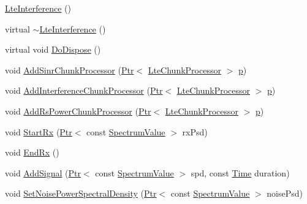 \begin{DoxyCompactItemize}
\item 
\hyperlink{classns3_1_1LteInterference_af0e69d3ae048802b5936815590be1a7c}{Lte\+Interference} ()
\item 
virtual \hyperlink{classns3_1_1LteInterference_a2ae87ae62fed89823398b056e28b862c}{$\sim$\+Lte\+Interference} ()
\item 
virtual void \hyperlink{classns3_1_1LteInterference_ab4fca869d5b5257da9e6b3539e302861}{Do\+Dispose} ()
\item 
void \hyperlink{classns3_1_1LteInterference_a129dde19892e0f1bf051cffef703b680}{Add\+Sinr\+Chunk\+Processor} (\hyperlink{classns3_1_1Ptr}{Ptr}$<$ \hyperlink{classns3_1_1LteChunkProcessor}{Lte\+Chunk\+Processor} $>$ \hyperlink{lte__link__budget__x2__handover__measures_8m_ac9de518908a968428863f829398a4e62}{p})
\item 
void \hyperlink{classns3_1_1LteInterference_a5ef052764d2767c0e2e6524ff889d29d}{Add\+Interference\+Chunk\+Processor} (\hyperlink{classns3_1_1Ptr}{Ptr}$<$ \hyperlink{classns3_1_1LteChunkProcessor}{Lte\+Chunk\+Processor} $>$ \hyperlink{lte__link__budget__x2__handover__measures_8m_ac9de518908a968428863f829398a4e62}{p})
\item 
void \hyperlink{classns3_1_1LteInterference_ab5723bb3bd52a577aceaecd019e8ba1c}{Add\+Rs\+Power\+Chunk\+Processor} (\hyperlink{classns3_1_1Ptr}{Ptr}$<$ \hyperlink{classns3_1_1LteChunkProcessor}{Lte\+Chunk\+Processor} $>$ \hyperlink{lte__link__budget__x2__handover__measures_8m_ac9de518908a968428863f829398a4e62}{p})
\item 
void \hyperlink{classns3_1_1LteInterference_ac22640d17df2793412cf169fb4768e90}{Start\+Rx} (\hyperlink{classns3_1_1Ptr}{Ptr}$<$ const \hyperlink{classns3_1_1SpectrumValue}{Spectrum\+Value} $>$ rx\+Psd)
\item 
void \hyperlink{classns3_1_1LteInterference_a41504a02d0e6e9a5a4b181e144ee7aaa}{End\+Rx} ()
\item 
void \hyperlink{classns3_1_1LteInterference_a50f2548797e7c92c4afd06710e0f8a8a}{Add\+Signal} (\hyperlink{classns3_1_1Ptr}{Ptr}$<$ const \hyperlink{classns3_1_1SpectrumValue}{Spectrum\+Value} $>$ spd, const \hyperlink{classns3_1_1Time}{Time} duration)
\item 
void \hyperlink{classns3_1_1LteInterference_a372c2dd174d5b5339f1aa8ed0d96b1e9}{Set\+Noise\+Power\+Spectral\+Density} (\hyperlink{classns3_1_1Ptr}{Ptr}$<$ const \hyperlink{classns3_1_1SpectrumValue}{Spectrum\+Value} $>$ noise\+Psd)
\end{DoxyCompactItemize}
